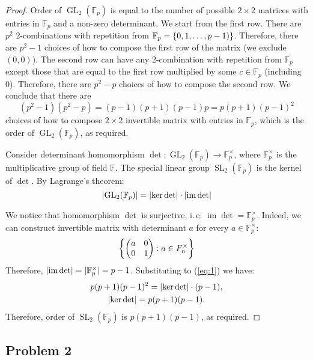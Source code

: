 \documentclass{article}
\theoremstyle{definition}
\DeclareMathOperator{\im}{\operatorname{im}}
\newcommand{\F}{\mathbb{F}}
\newcommand{\GL}{\operatorname{GL}}
\newcommand{\SL}{\operatorname{SL}}
\DeclarePairedDelimiter\set{\{}{\}}
\DeclarePairedDelimiter\abs{\lvert}{\rvert}
\begin{document}
\begin{proof}
Order of $\GL_2(\F_p)$ is equal to the number of possible $2 \times 2$ matrices with entries in $\F_p$ and a non-zero determinant.
We start from the first row.
There are $p^2$ 2-combinations with repetition from $\F_p = \set{0, 1, \dots, p-1)}$.
Therefore, there are $p^2-1$ choices of how to compose the first row of the matrix (we exclude $(0,0)$).
The second row can have any 2-combination with repetition from $\F_p$ except those that are equal to the first row multiplied by some $c \in \F_p$ (including $0$).
Therefore, there are $p^2 - p$ choices of how to compose the second row. We conclude that there are
\[ (p^2-1)(p^2-p) = (p-1)(p+1)(p-1)p = p(p+1)(p-1)^2 \]
choices of how to compose $2 \times 2$ invertible matrix with entries in $\F_p$, which is the order of $\GL_2(\F_p)$, as required.

Consider determinant homomorphism $\det : \GL_2(\F_p) \to \F_p^\times$, where $\F_p^\times$ is the multiplicative group of field $\F$.
The special linear group $\SL_2(\F_p)$ is the kernel of $\det$. By Lagrange's theorem:
\begin{equation} \label{eq:1}
    \abs{ \GL_2(\F_p) } = \abs{ \ker \det } \cdot \abs{ \im \det }
\end{equation} 

We notice that homomorphism $\det$ is surjective, i.\,e. $\im \det = \F_p^\times$. 
Indeed, we can construct invertible matrix with determinant $a$ for every $a \in \F_p^\times$:
\[
    \set*{
    \begin{pmatrix}
        a & 0 \\
        0 & 1
    \end{pmatrix}
    : a \in F_n^\times 
    }
\]
Therefore, $\abs{\im \det} = \abs{\F_p^\times} = p-1$.
Substituting to (\ref{eq:1}) we have:
\begin{gather*}
    p(p+1)(p-1)^2 = \abs{\ker \det} \cdot (p-1), \\
    \abs{\ker \det} = p(p+1)(p-1).
\end{gather*}
Therefore, order of $\SL_2(\F_p)$ is $p(p+1)(p-1)$, as required.

\end{proof}


\subsection*{Problem 2}
\end{document}

